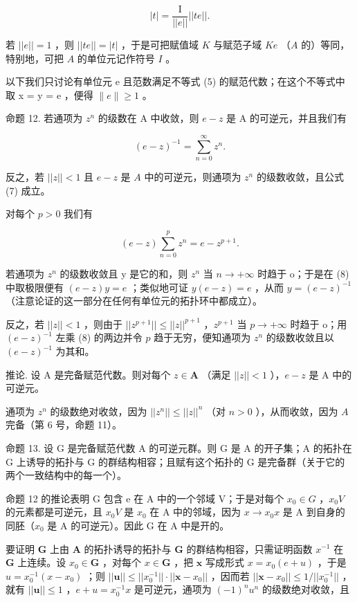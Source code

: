 \[
| t | = \frac {\mathrm{I}}{| | e | |} | | t e | |.
\]

若 \(||e|| = 1\) ，则 \(||te|| = |t|\) ，于是可把赋值域 \(K\) 与赋范子域 \(Ke\) （\(A\) 的）等同，特别地，可把 \(A\) 的单位元记作符号 \(I\) 。

以下我们只讨论有单位元 e 且范数满足不等式 (5) 的赋范代数；在这个不等式中取 x = y = e ，便得 \(\|e\| \geqslant 1\) 。

命题 12. 若通项为 \(z^n\) 的级数在 A 中收敛，则 \(e - z\) 是 A 的可逆元，并且我们有

\[
(e - z) ^ {- 1} = \sum_ {n = 0} ^ {\infty} z ^ {n}.\tag{7}
\]

反之，若 \(||z|| < 1\) 且 \(e - z\) 是 \(A\) 中的可逆元，则通项为 \(z^n\) 的级数收敛，且公式 (7) 成立。

对每个 \(p > 0\) 我们有

\[
(e - z) \sum_ {n = 0} ^ {p} z ^ {n} = e - z ^ {p + 1}.\tag{8}
\]

若通项为 \(z^{n}\) 的级数收敛且 y 是它的和，则 \(z^{n}\) 当 \(n \to +\infty\) 时趋于 o；于是在 (8) 中取极限便有 \((e - z)y = e\) ；类似地可证 \(y(e - z) = e\) ，从而 \(y = (e - z)^{-1}\) （注意论证的这一部分在任何有单位元的拓扑环中都成立）。

反之，若 \(||z|| < 1\) ，则由于 \(||z^{p+1}|| \leqslant ||z||^{p+1}\) ，\(z^{p+1}\) 当 \(p \to +\infty\) 时趋于 o；用 \((e - z)^{-1}\) 左乘 (8) 的两边并令 \(p\) 趋于无穷，便知通项为 \(z^n\) 的级数收敛且以 \((e - z)^{-1}\) 为其和。

推论. 设 A 是完备赋范代数。则对每个 \(z \in \mathbf{A}\) （满足 \(||z|| < 1\) ），\(e - z\) 是 A 中的可逆元。

通项为 \(z^n\) 的级数绝对收敛，因为 \(||z^n|| \leqslant ||z||^n\) （对 \(n > 0\) ），从而收敛，因为 \(A\) 完备（第 6 号，命题 11）。

命题 13. 设 G 是完备赋范代数 A 的可逆元群。则 G 是 A 的开子集；A 的拓扑在 G 上诱导的拓扑与 G 的群结构相容；且赋有这个拓扑的 G 是完备群（关于它的两个一致结构中的每一个）。

命题 12 的推论表明 G 包含 e 在 A 中的一个邻域 V；于是对每个 \(x_{0} \in G\) ，\(x_{0}V\) 的元素都是可逆元，且 \(x_{0}V\) 是 \(x_{0}\) 在 A 中的邻域，因为 \(x \to x_{0}x\) 是 A 到自身的同胚（\(x_{0}\) 是 A 的可逆元）。因此 G 在 A 中是开的。

要证明 \(\mathbf{G}\) 上由 \(\mathbf{A}\) 的拓扑诱导的拓扑与 \(\mathbf{G}\) 的群结构相容，只需证明函数 \(x^{-1}\) 在 \(\mathbf{G}\) 上连续。设 \(x_0 \in \mathbf{G}\) ，对每个 \(x \in \mathbf{G}\) ，把 \(\boldsymbol{x}\) 写成形式 \(x = x_0 (e + u)\) ，于是 \(u = x_0^{-1}(x - x_0)\) ；则 \(||\boldsymbol{u}|| \leqslant ||x_0^{-1}|| \cdot ||\boldsymbol{x} - x_0||\) ，因而若 \(||\boldsymbol{x} - x_0|| \leqslant 1 / ||x_0^{-1}||\) ，就有 \(||\boldsymbol{u}|| \leqslant 1\) ，\(e + u = x_0^{-1}x\) 是可逆元，通项为 \((-1)^n u^n\) 的级数绝对收敛，且

